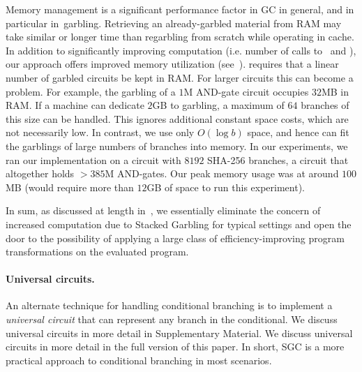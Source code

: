 Memory management is a significant performance factor in GC
in general, and in particular in~\HK garbling.  Retrieving an
already-garbled material from RAM may take similar or longer time than
regarbling from scratch while operating in cache.
In addition to significantly improving computation (i.e. number
of calls to \Gb\ and \Ev), our approach offers improved
memory utilization (see~).
\HK requires that a linear number of
garbled circuits be kept in RAM.  For larger circuits this can become
a problem.
For example, the garbling of a $1$M AND-gate circuit
occupies $32$MB in RAM.
If a machine can dedicate $2$GB to garbling, a maximum of
$64$ branches of this size can be handled. This
ignores additional constant space costs, which are not necessarily
low.
%
In contrast, we use only $O(\log b)$ space, and hence can
fit the garblings of large numbers of branches into memory.
In our experiments, we ran our implementation on a circuit with $8192$
SHA-256 branches, a circuit that altogether holds $> 385$M AND-gates.
Our peak memory usage was at around $100$MB (\HK would require more
than $12$GB of space to run this experiment).



In sum, as discussed at length
in~, we
essentially eliminate the concern of increased computation due to
Stacked Garbling for typical settings 
and open the door to the possibility of applying a large class of
efficiency-improving program transformations on the evaluated program.


\paragraph{Universal circuits.}
An alternate technique for handling conditional branching is to
implement a \emph{universal circuit} that can represent any branch in
the conditional.
\iffull
We discuss universal circuits in more detail in Supplementary Material.
\else
We discuss universal circuits in more detail in the full version of this paper.
\fi
In short, SGC is a more practical approach to conditional branching in
most scenarios.

